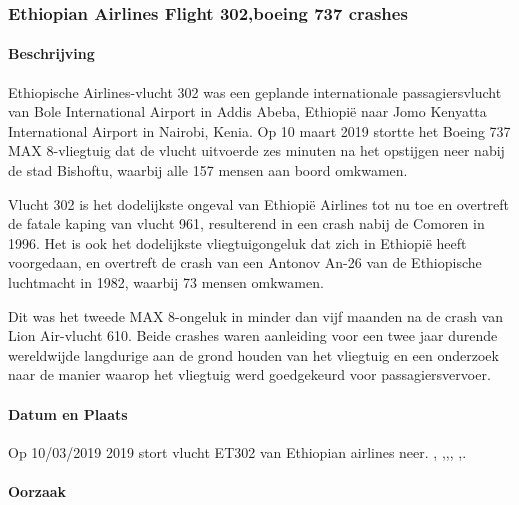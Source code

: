 \documentclass{article}
\begin{document}
	\subsubsection{Ethiopian Airlines Flight 302,boeing 737 crashes}
	
	\paragraph{Beschrijving}
		
Ethiopische Airlines-vlucht 302 was een geplande internationale passagiersvlucht van Bole International Airport in Addis Abeba, Ethiopië naar Jomo Kenyatta International Airport in Nairobi, Kenia. Op 10 maart 2019 stortte het Boeing 737 MAX 8-vliegtuig dat de vlucht uitvoerde zes minuten na het opstijgen neer nabij de stad Bishoftu, waarbij alle 157 mensen aan boord omkwamen.

Vlucht 302 is het dodelijkste ongeval van Ethiopië Airlines tot nu toe en overtreft de fatale kaping van vlucht 961, resulterend in een crash nabij de Comoren in 1996. Het is ook het dodelijkste vliegtuigongeluk dat zich in Ethiopië heeft voorgedaan, en overtreft de crash van een Antonov An-26 van de Ethiopische luchtmacht in 1982, waarbij 73 mensen omkwamen.

Dit was het tweede MAX 8-ongeluk in minder dan vijf maanden na de crash van Lion Air-vlucht 610. Beide crashes waren aanleiding voor een twee jaar durende wereldwijde langdurige aan de grond houden van het vliegtuig en een onderzoek naar de manier waarop het vliegtuig werd goedgekeurd voor passagiersvervoer.
	\paragraph{Datum en Plaats}
	\newline \indent  Op  10/03/2019 2019 stort vlucht ET302 van Ethiopian airlines neer.  \cite{gates18112020boeingcrisis},
	\cite{boeing737maxsoftwareprobles},\cite{avetisov19032019boeingmalwarestate},\cite{thompson23112020nationalsecurityboeing},
	\cite{wiki737maxgroundings},\cite{campbell02052019boengcrashhumanerrors}.
	
 
	\paragraph{Oorzaak}
	
\end{document}
